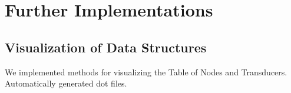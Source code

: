 \chapter{Further Implementations}\label{chapter:implementation}

\par
\par
\par



\section{Visualization of Data Structures}
We implemented methods for visualizing the Table of Nodes and Transducers. Automatically generated dot files.

